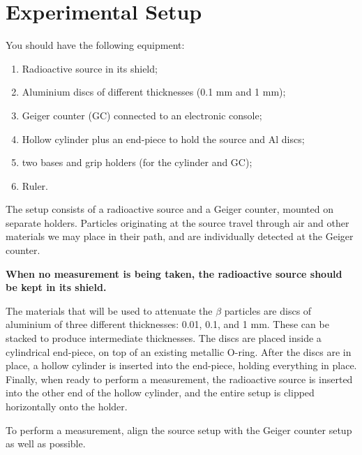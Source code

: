 \section{Experimental Setup}

You should have the following equipment:

\begin{enumerate}
\item{Radioactive source in its shield;}
\item{Aluminium discs of different thicknesses (0.1 mm and 1 mm);}
\item{Geiger counter (GC) connected to an electronic console;}
\item{Hollow cylinder plus an end-piece to hold the source and Al discs;}
\item{two bases and grip holders (for the cylinder and GC);}
\item{Ruler.}
\end{enumerate}


The setup consists of a radioactive source and a Geiger counter, mounted on separate holders. Particles originating at the source travel through air and other materials we may place in their path, and are individually detected at the Geiger counter.

\textbf{When no measurement is being taken, the radioactive source should be kept in its shield.}

The materials that will be used to attenuate the $\beta$ particles are discs of aluminium of three different thicknesses: 0.01, 0.1, and 1 mm. These can be stacked to produce intermediate thicknesses. The discs are placed inside a cylindrical end-piece, on top of an existing metallic O-ring. After the discs are in place, a hollow cylinder is inserted into the end-piece, holding everything in place. Finally, when ready to perform a measurement, the radioactive source is inserted into the other end of the hollow cylinder, and the entire setup is clipped horizontally onto the holder.

To perform a measurement, align the source setup with the Geiger counter setup as well as possible.